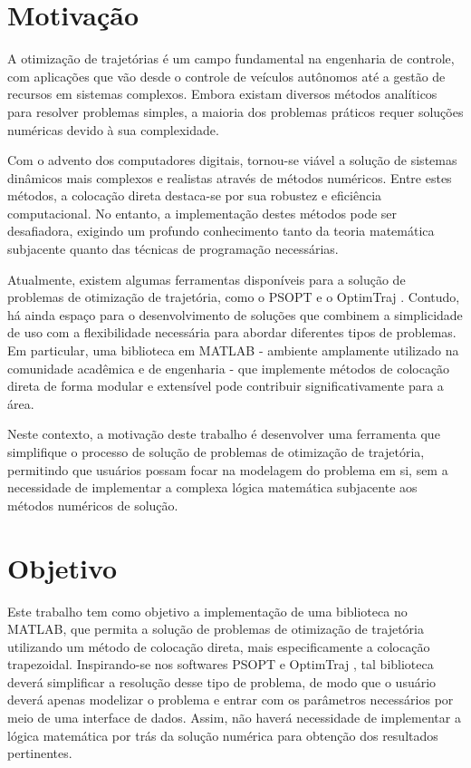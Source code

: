 \section{Motivação}
\label{sec:motivação}

A otimização de trajetórias é um campo fundamental na engenharia de controle, com aplicações que vão desde o controle de veículos autônomos até a gestão de recursos em sistemas complexos. Embora existam diversos métodos analíticos para resolver problemas simples, a maioria dos problemas práticos requer soluções numéricas devido à sua complexidade.

Com o advento dos computadores digitais, tornou-se viável a solução de sistemas dinâmicos mais complexos e realistas através de métodos numéricos. Entre estes métodos, a colocação direta destaca-se por sua robustez e eficiência computacional. No entanto, a implementação destes métodos pode ser desafiadora, exigindo um profundo conhecimento tanto da teoria matemática subjacente quanto das técnicas de programação necessárias.

Atualmente, existem algumas ferramentas disponíveis para a solução de problemas de otimização de trajetória, como o PSOPT \cite{becerra_psopt_2022} e o OptimTraj \cite{kelly_optimtraj_2022}. Contudo, há ainda espaço para o desenvolvimento de soluções que combinem a simplicidade de uso com a flexibilidade necessária para abordar diferentes tipos de problemas. Em particular, uma biblioteca em MATLAB - ambiente amplamente utilizado na comunidade acadêmica e de engenharia - que implemente métodos de colocação direta de forma modular e extensível pode contribuir significativamente para a área.

Neste contexto, a motivação deste trabalho é desenvolver uma ferramenta que simplifique o processo de solução de problemas de otimização de trajetória, permitindo que usuários possam focar na modelagem do problema em si, sem a necessidade de implementar a complexa lógica matemática subjacente aos métodos numéricos de solução.


\section{Objetivo}
\label{sec:objetivo}

Este trabalho tem como objetivo a implementação de uma biblioteca no MATLAB, que permita a solução de problemas de otimização de trajetória utilizando um método de colocação direta, mais especificamente a colocação trapezoidal. Inspirando-se nos softwares PSOPT \cite{becerra_psopt_2022} e OptimTraj \cite{kelly_optimtraj_2022}, tal biblioteca deverá simplificar a resolução desse tipo de problema, de modo que o usuário deverá apenas modelizar o problema e entrar com os parâmetros necessários por meio de uma interface de dados. Assim, não haverá necessidade de implementar a lógica matemática por trás da solução numérica para obtenção dos resultados pertinentes.


